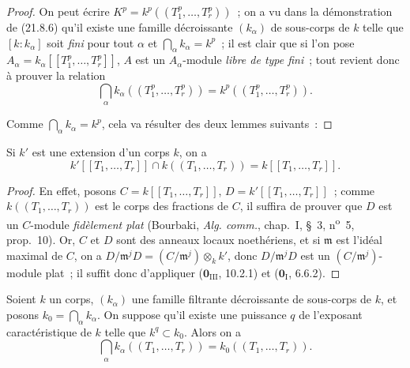 \begin{proof}
On peut écrire $K^p=k^p((T_1^p,\ldots,T_r^p))$~; on a vu dans la démonstration
de (21.8.6) qu'il existe une famille décroissante $(k_\alpha)$ de sous-corps
de $k$ telle que $[k:k_\alpha]$ soit \emph{fini} pour tout $\alpha$ et
$\bigcap_\alpha k_\alpha=k^p$~; il est clair que si l'on pose
$A_\alpha=k_\alpha[[T_1^p,\ldots,T_r^p]]$, $A$ est un $A_\alpha$-module
\emph{libre de type fini}~; tout revient donc à prouver la relation
\begin{equation}
\tag{21.8.8.1}
\label{0.21.8.8.1-fr}
  \bigcap_\alpha k_\alpha((T_1^p,\ldots,T_r^p))
  =k^p((T_1^p,\ldots,T_r^p)).
\end{equation}

Comme $\bigcap_\alpha k_\alpha=k^p$, cela va résulter des deux lemmes suivants~:
\end{proof}

\begin{lemma}[21.8.8.2]
\label{0.21.8.8.2-fr}
Si $k'$ est une extension d'un corps $k$, on a
\[
  k'[[T_1,\ldots,T_r]]\cap k((T_1,\ldots,T_r))=k[[T_1,\ldots,T_r]].
\]
\end{lemma}

\begin{proof}
En effet, posons $C=k[[T_1,\ldots,T_r]]$, $D=k'[[T_1,\ldots,T_r]]$~; comme
$k((T_1,\ldots,T_r))$ est le corps des fractions de $C$, il suffira de
prouver que $D$ est un $C$-module \emph{fidèlement plat} (Bourbaki,
\emph{Alg. comm.}, chap.~I, \S~3, n\textsuperscript{o}~5, prop.~10). Or, $C$
et $D$ sont des anneaux locaux noethériens, et si $\mathfrak m$ est l'idéal
maximal de $C$, on a
$D/\mathfrak m^jD=(C/\mathfrak m^j)\otimes_k k'$, donc
$D/\mathfrak m^jD$ est un $(C/\mathfrak m^j)$-module plat~; il suffit donc
d'appliquer ($\mathbf 0_{\mathrm{III}}$, 10.2.1) et
($\mathbf 0_{\mathrm I}$, 6.6.2).
\end{proof}

\begin{lemma}[21.8.8.3]
\label{0.21.8.8.3-fr}
Soient $k$ un corps, $(k_\alpha)$ une famille filtrante décroissante de
sous-corps de $k$, et posons $k_0=\bigcap_\alpha k_\alpha$. On suppose qu'il
existe une puissance $q$ de l'exposant caractéristique de $k$ telle que
$k^q\subset k_0$. Alors on a
\begin{equation}
\tag{21.8.8.4}
\label{0.21.8.8.4-fr}
  \bigcap_\alpha k_\alpha((T_1,\ldots,T_r))=k_0((T_1,\ldots,T_r)).
\end{equation}
\end{lemma}


